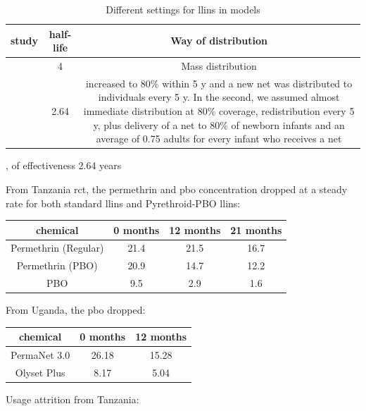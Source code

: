 \documentclass[a4paper, 12pt, twoside]{article}
\begin{document}
\begin{table}[htpb]
  \centering
  \caption{Different settings for \gls{llins} in models}
  \label{tab:different_settings_for_llins}
  \begin{tabular}{cSc}
  \toprule
  study & {half-life} & Way of distribution\\
  \midrule
  \cite{Briet2013} & 4 & Mass distribution \\
  \cite{Griffin2010} & 2.64 & increased to 80\% within 5 y and a new net was distributed to individuals every 5 y. In the second, we assumed almost immediate distribution at 80\% coverage, redistribution every 5 y, plus delivery of a net to 80\% of newborn infants and an average of 0.75 adults for every infant who receives a net \\
  \bottomrule
  \end{tabular}
\end{table}
, of effectiveness 2.64 years

From Tanzania\cite{Protopopoff2018} \gls{rct}, the permethrin and \gls{pbo} concentration dropped at a steady rate for both standard \gls{llins} and Pyrethroid-PBO \gls{llins}:

\begin{center}
	\begin{tabular}{cccc}
		\toprule
		chemical             & 0 months & 12 months & 21 months \\
		\midrule
		Permethrin (Regular) & 21.4     & 21.5      & 16.7      \\
		Permethrin (PBO)     & 20.9     & 14.7      & 12.2      \\
		PBO                  & 9.5      & 2.9       & 1.6       \\
		\bottomrule
	\end{tabular}
\end{center}

From Uganda\cite{Staedke2020}, the \gls{pbo} dropped:
\begin{center}
	\begin{tabular}{c c c}
		\toprule
		chemical     & 0 months & 12 months \\
		\midrule
		PermaNet 3.0 & 26.18    & 15.28     \\
		Olyset Plus  & 8.17     & 5.04      \\
		\bottomrule
	\end{tabular}
\end{center}

Usage attrition from Tanzania\cite{Protopopoff2018}:
\end{document}
